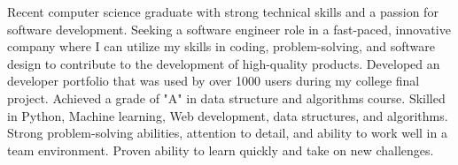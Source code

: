 

\begin{cvparagraph}

Recent computer science graduate with strong technical skills and a passion for software development. Seeking a software engineer role in a fast-paced, innovative company where I can utilize my skills in coding, problem-solving, and software design to contribute to the development of high-quality products.
Developed an developer portfolio that was used by over 1000 users during my college final project. Achieved a grade of "A" in data structure and algorithms course. Skilled in  Python, Machine learning, Web development, data structures, and algorithms. Strong problem-solving abilities, attention to detail, and ability to work well in a team environment. Proven ability to learn quickly and take on new challenges.
\end{cvparagraph}